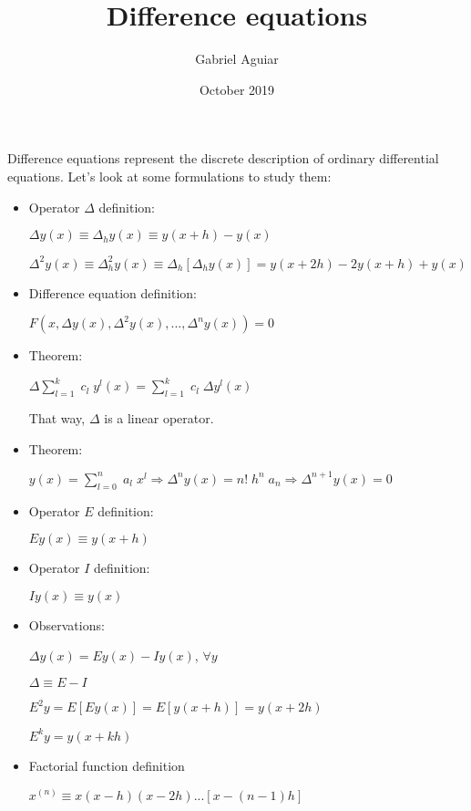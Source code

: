 \documentclass{article}
\title{Difference equations}
\author{Gabriel Aguiar}
\date{October 2019}
\begin{document}
\maketitle

Difference equations represent the discrete description of ordinary differential equations. Let's look at some formulations to study them:

\begin{itemize}

\item Operator $\Delta$ definition:

$\Delta y(x) \equiv \Delta_{h} y(x) \equiv y(x + h) - y(x)$

$\Delta^{2} y(x) \equiv \Delta_{h}^{2} y(x) \equiv \Delta_{h} [\Delta_{h} y(x)] = y(x + 2h) - 2y(x + h) + y(x)$

\item Difference equation definition:

$F(x,\Delta y(x),\Delta^{2} y(x),...,\Delta^{n}y(x)) = 0$

\item Theorem:

$\Delta \sum\limits_{l = 1}^{k} \; c_{l} \; y^{l} (x) = \sum\limits_{l = 1}^{k} \; c_{l} \; \Delta y^{l} (x)$

That way, $\Delta$ is a linear operator.

\item Theorem:

$y(x) = \sum\limits_{l = 0}^{n} \; a_{l} \; x^{l} \Rightarrow \Delta^{n} y(x) = n! \; h^{n} \; a_{n} \Rightarrow \Delta^{n + 1} y(x) = 0$

\item Operator $E$ definition:

$Ey(x) \equiv y(x + h)$

\item Operator $I$ definition:

$Iy(x) \equiv y(x)$

\item Observations:

$\Delta y(x) = Ey(x) - Iy(x)$, $\forall y$

$\Delta \equiv E - I$

$E^{2} y = E[Ey(x)] = E[y(x + h)] = y(x + 2h)$

$E^{k} y = y(x + kh)$

\item Factorial function definition

$x^{(n)} \equiv x(x - h)(x - 2h) ... [x - (n - 1)h]$


\end{itemize}
\end{document}
